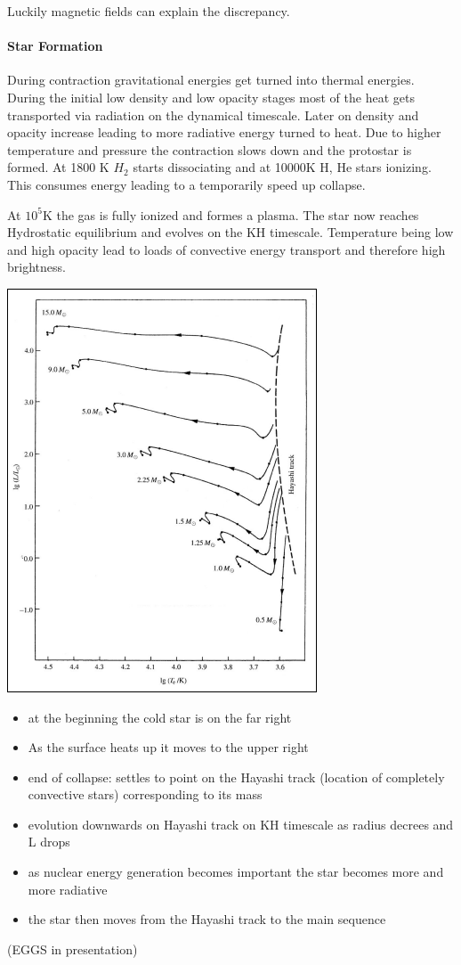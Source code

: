 \documentclass[11pt,a4paper]{article}
\begin{document}
Luckily magnetic fields can explain the discrepancy.

\paragraph{Star Formation}
During contraction gravitational energies get turned into thermal energies. 
During the initial low density and low opacity stages most of the heat gets transported via radiation on the dynamical timescale. 
Later on density and opacity increase leading to more radiative energy turned to heat. 
Due to higher temperature and pressure the contraction slows down and the protostar is formed.
At 1800 K $H_2$ starts dissociating and at 10000K H, He stars ionizing. 
This consumes energy leading to a temporarily speed up collapse.

At $10^5$K the gas is fully ionized and formes a plasma.
The star now reaches Hydrostatic equilibrium and evolves on the KH timescale.
Temperature being low and high opacity lead to loads of convective energy transport and therefore high brightness.
\begin{center}
    \includegraphics[width=0.5\linewidth]{screenshot_2024-01-21-194512.png}
\end{center}
\begin{itemize}
    \item at the beginning the cold star is on the far right
    \item As the surface heats up it moves to the upper right
    \item end of collapse: settles to point on the
Hayashi track (location of completely convective stars) corresponding to its mass
    \item evolution downwards on Hayashi track on KH timescale as radius decrees and L drops
    \item as nuclear energy generation becomes important the star becomes more and more radiative 
    \item the star then moves from the Hayashi track to the main sequence
\end{itemize}
(EGGS in presentation)
\end{document}
